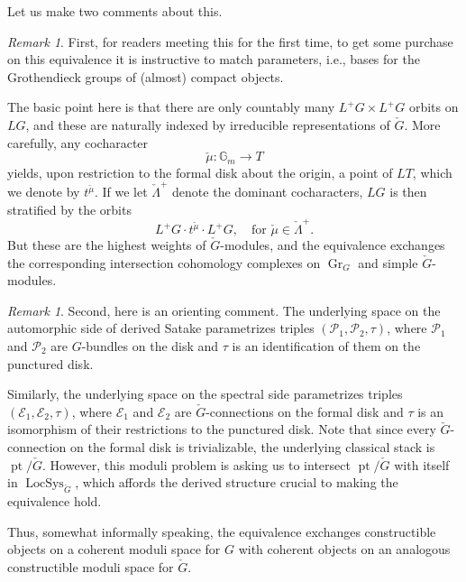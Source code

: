 \documentclass[10pt]{amsart}
\newcommand{\pt}{\on{pt}}
\newcommand{\LS}{\on{LocSys}_{\cG}}
\newcommand{\on}{\operatorname}
\theoremstyle{remark}
\newtheorem{re}[subsubsection]{Remark}
\newcommand{\sP}{\mathscr{P}}
\newcommand{\sE}{\mathscr{E}}
\newcommand{\Gr}{\operatorname{Gr}}
\numberwithin{equation}{section}
\newcommand{\cG}{\check{G}}
\begin{document}
\fi 

Let us make two comments about this.

\begin{re} \label{r:paramcount} First, for readers meeting this for the first time, to get some 
purchase on this equivalence it is 
instructive to match parameters, i.e., bases for the Grothendieck groups of 
(almost) compact objects. 
	
 The basic point here is that there are 
	only countably many $L^+G \times L^+G$ orbits on $LG$, and these are 
	naturally indexed by irreducible representations of $\cG$. More carefully, 
	any 
	cocharacter
	\[
	   \check{\mu}: \mathbb{G}_m \rightarrow T	\]
	yields, upon restriction to the formal disk about the origin, a point of 
	$LT$, which we denote by $t^{\check{\mu}}$. If we let 
	$\check{\Lambda}^+$ denote the dominant cocharacters, $LG$ is then stratified by 
	the orbits
	\[
   L^+G \cdot t^{\check{\mu}} \cdot L^+G, \quad \text{for } \check{\mu} \in 
   \check{\Lambda}^+. 
\] 
But these are the highest weights of $\cG$-modules, and the equivalence 
exchanges 
the corresponding intersection cohomology complexes on $\Gr_G$ and simple 
$\cG$-modules. 	\end{re}  




\begin{re} Second, here is an orienting comment. The underlying space on the 
automorphic side of derived Satake 
parametrizes triples $(\sP_1, \sP_2, \tau)$, where $\sP_1$ and $\sP_2$ are 
$G$-bundles on the disk and $\tau$ is an identification of them on the 
punctured disk.
	
	Similarly, the underlying space on the spectral side parametrizes triples 
	$(\sE_1, \sE_2, \tau)$, where $\sE_1$ and $\sE_2$ are $\cG$-connections on 
	the formal disk and $\tau$ is an isomorphism of their restrictions 
	to the punctured disk. Note that since every $\cG$-connection on the formal disk is trivializable, the underlying classical stack is $\pt / \cG$. However, this moduli problem is asking us to intersect $\pt / \cG$ with itself in $\LS$, which affords the derived structure crucial to making the equivalence hold. 
	 	
	 Thus, somewhat informally speaking, the equivalence exchanges 
	 constructible objects on a coherent moduli space for $G$ with coherent 
	 objects on an analogous constructible moduli space for $\cG$. 	
	 	
\end{re}	
\end{document}

